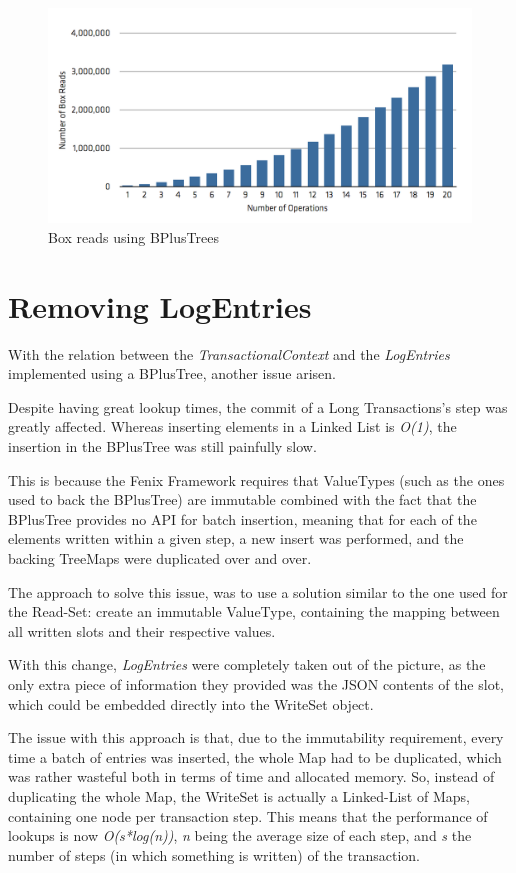 \begin{figure}
\centering
\includegraphics[width=0.9\linewidth]{box-long-bplus}
\caption{Box reads using BPlusTrees}
\label{fig:boxesBPlus}
\end{figure}


\section{Removing LogEntries}

With the relation between the {\it TransactionalContext} and the {\it
  LogEntries} implemented using a BPlusTree, another issue arisen. 

Despite having great lookup times, the commit of a Long Transactions's
step was greatly affected. Whereas inserting elements in a Linked List
is {\it O(1)}, the insertion in the BPlusTree was still painfully
slow.

This is because the Fenix Framework requires that ValueTypes (such as
the ones used to back the BPlusTree) are immutable combined with the
fact that the BPlusTree provides no API for batch insertion, meaning
that for each of the elements written within a given step, a new
insert was performed, and the backing TreeMaps were duplicated over
and over. 

The approach to solve this issue, was to use a solution similar to the
one used for the Read-Set: create an immutable ValueType, containing
the mapping between all written slots and their respective values.

With this change, {\it LogEntries} were completely taken out of the
picture, as the only extra piece of information they provided was the
JSON contents of the slot, which could be embedded directly into the
WriteSet object.

The issue with this approach is that, due to the immutability
requirement, every time a batch of entries was inserted, the whole Map
had to be duplicated, which was rather wasteful both in terms of time
and allocated memory. So, instead of duplicating the whole Map, the
WriteSet is actually a Linked-List of Maps, containing one node per
transaction step. This means that the performance of lookups is now
{\it O(s*log(n))}, {\it n} being the average size of each step, and
{\it s} the number of steps (in which something is written) of the
transaction.


